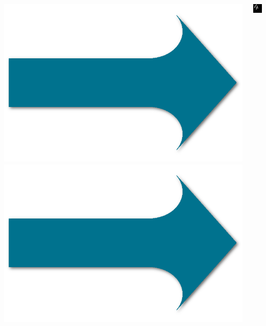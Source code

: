 \documentclass[xcolor=pdftex,dvipsnames,table]{beamer}
\begin{document}
\begin{frame}
\begin{columns}
\begin{column}{0.05\textwidth}
			\includegraphics[width=1\textwidth]{arrow.png}\\
			\includegraphics[width=1\textwidth]{arrow.png}
		\end{column}
		\begin{column}{0.25\textwidth}
			\includegraphics[width=1\textwidth]{4_input.png}

\end{column}
\end{columns}
\end{frame}
\end{document}
